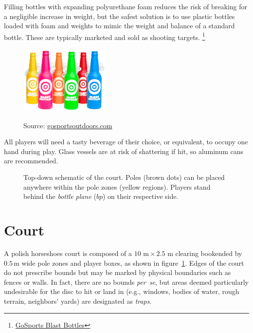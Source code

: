 \documentclass[11pt,letterpaper,twocolumn,english,DIV=calc]{scrartcl}
\begin{document}
\begin{description}[font=\large, leftmargin=0.5em]
		Filling bottles with expanding polyurethane foam reduces the risk of breaking for a negligible increase in weight, but the safest solution is to use plastic bottles loaded with foam and weights to mimic the weight and balance of a standard bottle. 
		These are typically marketed and sold as shooting targets.%
		\footnote{\href{https://gosportsoutdoors.com/products/gosports-outdoors-blast-bottles-6-pack-shatterproof-bottle-shooting-targets-with-rope-for-firearm-target-practice}{GoSports Blast Bottles}}
		\begin{figure}[h]
			\centering{}
			\includegraphics[width=0.4\textwidth]{images/blastbottles}{\footnotesize{}

			Source:
			\href{https://gosportsoutdoors.com}{gosportsoutdoors.com}}
		\end{figure}
		
	\item [{Tasty~beverages:}] 
		All players will need a tasty beverage of their choice, or equivalent, to occupy one hand during play. 
		Glass vessels are at risk of shattering if hit, so aluminum cans are recommended.
\end{description}
\vfill

\begin{figure}[hpbt!]
	\begin{centering}
		\vspace{-5mm}\par
	\end{centering}
	\caption{
		Top-down schematic of the court. 
		Poles (brown dots) can be placed anywhere within the pole zones (yellow regions). 
		Players stand behind the \emph{bottle plane} ($bp$) on their respective side.\label{fig:court}
	}
\end{figure}

\pagebreak
\part*{Court}%

A polish horseshoes court is composed of a \mbox{$10\textrm{ m}\times2.5\textrm{ m}$} clearing bookended by $0.5\,\mbox{m}$ wide pole zones and player boxes, as shown in figure~\ref{fig:court}.
Edges of the court do not prescribe bounds but may be marked by physical boundaries such as fences or walls.
In fact, there are no bounds \emph{per~se}, but areas deemed particularly undesirable for the disc to hit or land in (e.g., windows, bodies of water, rough terrain, neighbors' yards) are designated as \emph{traps}.
\end{document}

